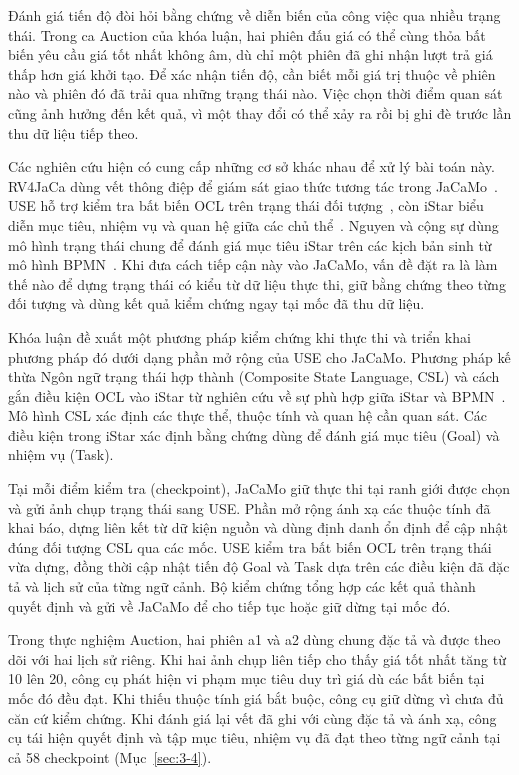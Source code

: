 \documentclass[12pt,a4paper,oneside]{extreport}
\begin{document}
Đánh giá tiến độ đòi hỏi bằng chứng về diễn biến của công việc qua nhiều trạng thái. Trong ca Auction của khóa luận, hai phiên đấu giá có thể cùng thỏa bất biến yêu cầu giá tốt nhất không âm, dù chỉ một phiên đã ghi nhận lượt trả giá thấp hơn giá khởi tạo. Để xác nhận tiến độ, cần biết mỗi giá trị thuộc về phiên nào và phiên đó đã trải qua những trạng thái nào. Việc chọn thời điểm quan sát cũng ảnh hưởng đến kết quả, vì một thay đổi có thể xảy ra rồi bị ghi đè trước lần thu dữ liệu tiếp theo.

Các nghiên cứu hiện có cung cấp những cơ sở khác nhau để xử lý bài toán này. RV4JaCa dùng vết thông điệp để giám sát giao thức tương tác trong JaCaMo~\cite{ref-24}. USE hỗ trợ kiểm tra bất biến OCL trên trạng thái đối tượng~\cite{ref-4}, còn iStar biểu diễn mục tiêu, nhiệm vụ và quan hệ giữa các chủ thể~\cite{ref-12}. Nguyen và cộng sự dùng mô hình trạng thái chung để đánh giá mục tiêu iStar trên các kịch bản sinh từ mô hình BPMN~\cite{ref-28}. Khi đưa cách tiếp cận này vào JaCaMo, vấn đề đặt ra là làm thế nào để dựng trạng thái có kiểu từ dữ liệu thực thi, giữ bằng chứng theo từng đối tượng và dùng kết quả kiểm chứng ngay tại mốc đã thu dữ liệu.

Khóa luận đề xuất một phương pháp kiểm chứng khi thực thi và triển khai phương pháp đó dưới dạng phần mở rộng của USE cho JaCaMo. Phương pháp kế thừa Ngôn ngữ trạng thái hợp thành (Composite State Language, CSL) và cách gắn điều kiện OCL vào iStar từ nghiên cứu về sự phù hợp giữa iStar và BPMN~\cite{ref-28}. Mô hình CSL xác định các thực thể, thuộc tính và quan hệ cần quan sát. Các điều kiện trong iStar xác định bằng chứng dùng để đánh giá mục tiêu (Goal) và nhiệm vụ (Task).

Tại mỗi điểm kiểm tra (checkpoint), JaCaMo giữ thực thi tại ranh giới được chọn và gửi ảnh chụp trạng thái sang USE. Phần mở rộng ánh xạ các thuộc tính đã khai báo, dựng liên kết từ dữ kiện nguồn và dùng định danh ổn định để cập nhật đúng đối tượng CSL qua các mốc. USE kiểm tra bất biến OCL trên trạng thái vừa dựng, đồng thời cập nhật tiến độ Goal và Task dựa trên các điều kiện đã đặc tả và lịch sử của từng ngữ cảnh. Bộ kiểm chứng tổng hợp các kết quả thành quyết định và gửi về JaCaMo để cho tiếp tục hoặc giữ dừng tại mốc đó.

Trong thực nghiệm Auction, hai phiên a1 và a2 dùng chung đặc tả và được theo dõi với hai lịch sử riêng. Khi hai ảnh chụp liên tiếp cho thấy giá tốt nhất tăng từ 10 lên 20, công cụ phát hiện vi phạm mục tiêu duy trì giá dù các bất biến tại mốc đó đều đạt. Khi thiếu thuộc tính giá bắt buộc, công cụ giữ dừng vì chưa đủ căn cứ kiểm chứng. Khi đánh giá lại vết đã ghi với cùng đặc tả và ánh xạ, công cụ tái hiện quyết định và tập mục tiêu, nhiệm vụ đã đạt theo từng ngữ cảnh tại cả 58 checkpoint (Mục~\ref{sec:3-4}).
\end{document}
